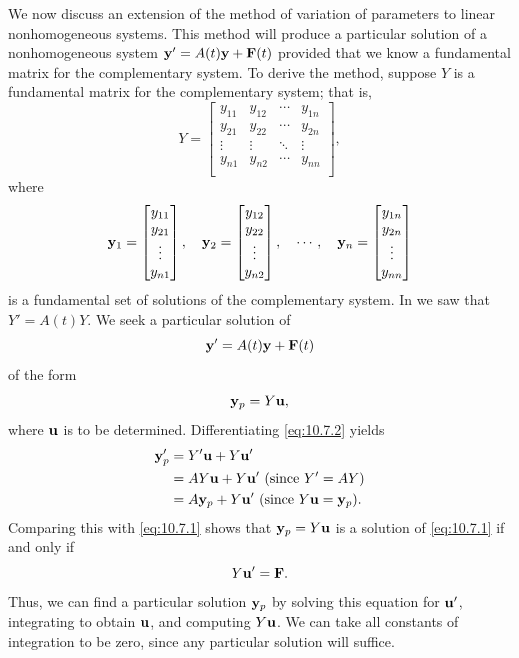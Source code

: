 
We now discuss an extension of the method of variation of parameters
to linear nonhomogeneous systems. This method will produce a
particular solution of a nonhomogeneous system $\mathbf{y}'=A(t)\mathbf{y}+\mathbf{F}(t)$ provided that we know a fundamental matrix for the
complementary system. To derive the method, suppose $Y$ is a
fundamental matrix for the complementary system; that is,
\[
Y=\begin{bmatrix}
y_{11}&y_{12}&\cdots&y_{1n} \\
y_{21}&y_{22}&\cdots&y_{2n}\\
\vdots&\vdots&\ddots&\vdots \\
y_{n1}&y_{n2}&\cdots&y_{nn} \\
\end{bmatrix},
\]
where
\[
\mathbf{y}_1=\begin{bmatrix}y_{11}\\y_{21}\\ \vdots\\y_{n1}\end{bmatrix},\quad
\mathbf{y}_2=\begin{bmatrix}y_{12}\\y_{22}\\ \vdots\\y_{n2}\end{bmatrix},
\quad \cdots,\quad
\mathbf{y}_n=\begin{bmatrix}y_{1n}\\y_{2n}\\ \vdots\\y_{nn}\end{bmatrix}
\]
is a fundamental set of solutions of the complementary system.
In  we saw that $Y'=A(t)Y$. We seek a
particular solution of
\begin{equation} \label{eq:10.7.1}
\mathbf{y}'=A(t)\mathbf{y}+\mathbf{F}(t)
\end{equation}
 of the form
\begin{equation} \label{eq:10.7.2}
\mathbf{y}_p=Y\mathbf{u},
\end{equation}
 where $\mathbf{u}$ is to be determined. Differentiating \eqref{eq:10.7.2} yields
\begin{align*}
 \mathbf{y}_p'&=Y' \mathbf{u}+Y \mathbf{u}'\\
 &=A Y \mathbf{u}+Y \mathbf{u}'\text{ (since $Y'=AY$)}\\
 &= A\mathbf{y}_p+Y \mathbf{u}'\text{ (since $Y\mathbf{u}=\mathbf{y}_p$)}.
\end{align*}
Comparing this with  \eqref{eq:10.7.1} shows that $\mathbf{y}_p=Y\mathbf{u}$ is a
solution of \eqref{eq:10.7.1} if and only if
\[
Y\mathbf{u}'=\mathbf{F}.
\]
Thus, we can find a particular solution $\mathbf{y}_p$ by solving this
equation for $\mathbf{u}'$, integrating to obtain $\mathbf{u}$, and
computing $Y\mathbf{u}$. We can take all constants of integration to be
zero, since any particular solution will suffice.

